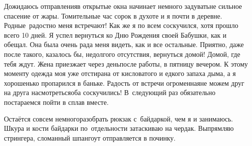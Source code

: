 Дожидаюсь отправления\mdash в открытые окна начинает немного задувать\mdash не сильное спасение от жары. Томительные час сорок в духоте и я почти в деревне. Родные~радостно меня встречают! Как же я по всем соскучился, хотя прошло всего 10 дней. Я успел вернуться ко Дню Рождения своей Бабушки, как и обещал. Она была очень рада меня видеть, как и все остальные. Приятно, даже после такого, казалось бы, недолгого отсутствия, вернуться домой! Домой, где тебя ждут. Жена приезжает через день\mdash после работы, в пятницу вечером. К этому моменту одежда моя уже отстирана от кисловатого и едкого запаха дыма, а я хорошенько пропарился в баньке. Радость от встречи огроменная\mdash не можем друг на друга насмотреться\mdash оба соскучились! В~следующий раз обязательно постараемся пойти в сплав вместе. 

Остаётся совсем немного\mdash разобрать рюкзак с~байдаркой, чем я и занимаюсь. Шкура и кости байдарки по~отдельности затаскиваю на чердак. Выпрямляю стрингера, сломанный шпангоут отправляется в починку. 

\begin{center}
\end{center}